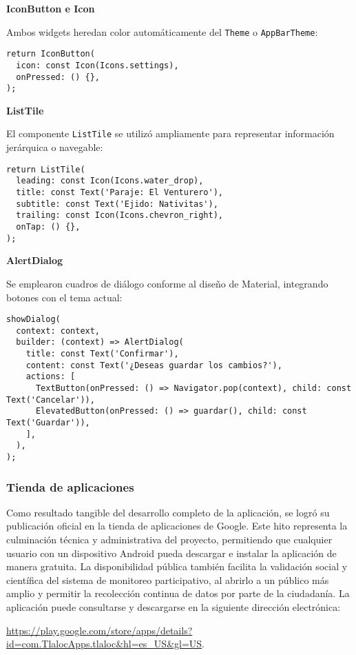 \textbf{IconButton e Icon}

Ambos widgets heredan color automáticamente del \texttt{Theme} o \texttt{AppBarTheme}:

\begin{verbatim}
return IconButton(
  icon: const Icon(Icons.settings),
  onPressed: () {},
);
\end{verbatim}

\textbf{ListTile}

El componente \texttt{ListTile} se utilizó ampliamente para representar información jerárquica o navegable:

\begin{verbatim}
return ListTile(
  leading: const Icon(Icons.water_drop),
  title: const Text('Paraje: El Venturero'),
  subtitle: const Text('Ejido: Nativitas'),
  trailing: const Icon(Icons.chevron_right),
  onTap: () {},
);
\end{verbatim}

\textbf{AlertDialog}

Se emplearon cuadros de diálogo conforme al diseño de Material, integrando botones con el tema actual:

\begin{verbatim}
showDialog(
  context: context,
  builder: (context) => AlertDialog(
    title: const Text('Confirmar'),
    content: const Text('¿Deseas guardar los cambios?'),
    actions: [
      TextButton(onPressed: () => Navigator.pop(context), child: const Text('Cancelar')),
      ElevatedButton(onPressed: () => guardar(), child: const Text('Guardar')),
    ],
  ),
);
\end{verbatim}
 



\newpage
\subsubsection*{Tienda de aplicaciones} 

Como resultado tangible del desarrollo completo de la aplicación, se logró su publicación oficial en la tienda de aplicaciones de Google. Este hito representa la culminación técnica y administrativa del proyecto, permitiendo que cualquier usuario con un dispositivo Android pueda descargar e instalar la aplicación de manera gratuita. La disponibilidad pública también facilita la validación social y científica del sistema de monitoreo participativo, al abrirlo a un público más amplio y permitir la recolección continua de datos por parte de la ciudadanía. La aplicación puede consultarse y descargarse en la siguiente dirección electrónica:
\begin{center}
   \url{https://play.google.com/store/apps/details?id=com.TlalocApps.tlaloc&hl=es_US&gl=US}.
\end{center}

